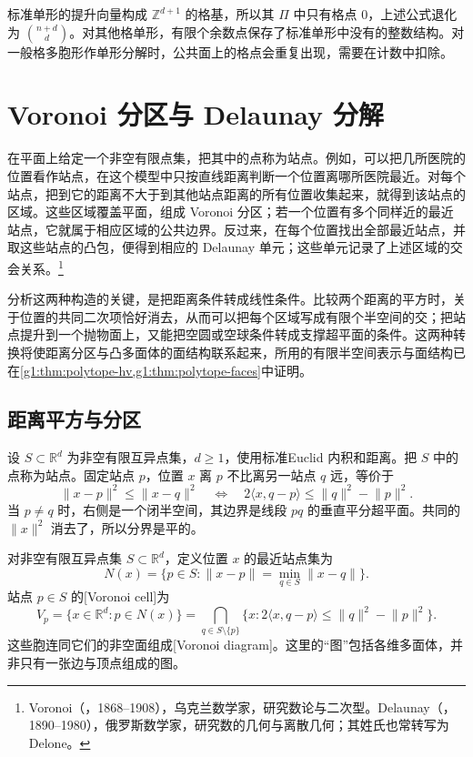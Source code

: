 标准单形的提升向量构成 \(\mathbb Z^{d+1}\) 的格基，所以其 \(\Pi\) 中只有格点 \(0\)，上述公式退化为 \(\binom{n+d}{d}\)。对其他格单形，有限个余数点保存了标准单形中没有的整数结构。对一般格多胞形作单形分解时，公共面上的格点会重复出现，需要在计数中扣除。

\section{Voronoi 分区与 Delaunay 分解}
\label{g1:sec:B02}

在平面上给定一个非空有限点集，把其中的点称为站点。例如，可以把几所医院的位置看作站点，在这个模型中只按直线距离判断一个位置离哪所医院最近。对每个站点，把到它的距离不大于到其他站点距离的所有位置收集起来，就得到该站点的区域。这些区域覆盖平面，组成 Voronoi 分区；若一个位置有多个同样近的最近站点，它就属于相应区域的公共边界。反过来，在每个位置找出全部最近站点，并取这些站点的凸包，便得到相应的 Delaunay 单元；这些单元记录了上述区域的交会关系。\footnote{Voronoi（，1868--1908），乌克兰数学家，研究数论与二次型。Delaunay（，1890--1980），俄罗斯数学家，研究数的几何与离散几何；其姓氏也常转写为 Delone。}

\ProseParagraphBreak

分析这两种构造的关键，是把距离条件转成线性条件。比较两个距离的平方时，关于位置的共同二次项恰好消去，从而可以把每个区域写成有限个半空间的交；把站点提升到一个抛物面上，又能把空圆或空球条件转成支撑超平面的条件。这两种转换将使距离分区与凸多面体的面结构联系起来，所用的有限半空间表示与面结构已在\cref{g1:thm:polytope-hv,g1:thm:polytope-faces}中证明。

\subsection{距离平方与分区}
\label{g1:subsec:B02:01}

设 \(S\subset\mathbb R^d\) 为非空有限互异点集，\(d\ge1\)，使用标准Euclid 内积和距离。把 \(S\) 中的点称为站点。固定站点 \(p\)，位置 \(x\) 离 \(p\) 不比离另一站点 \(q\) 远，等价于
\begin{equation}\label{g1:eq:voronoi-halfspace}
	\lVert x-p\rVert^2\le\lVert x-q\rVert^2
	\quad\Longleftrightarrow\quad
	2\langle x,q-p\rangle\le\lVert q\rVert^2-\lVert p\rVert^2.
\end{equation}
当 \(p\ne q\) 时，右侧是一个闭半空间，其边界是线段 \(pq\) 的垂直平分超平面。共同的 \(\lVert x\rVert^2\) 消去了，所以分界是平的。

\begin{definition}\label{g1:def:voronoi-cell}
	对非空有限互异点集 \(S\subset\mathbb R^d\)，定义位置 \(x\) 的最近站点集为
	\[
		N(x)=\{p\in S:\lVert x-p\rVert=\min_{q\in S}\lVert x-q\rVert\}.
	\]
	站点 \(p\in S\) 的[Voronoi cell]为
	\[
		V_p=\{x\in\mathbb R^d:p\in N(x)\}
		=\bigcap_{q\in S\setminus\{p\}}
		\{x:2\langle x,q-p\rangle\le\lVert q\rVert^2-\lVert p\rVert^2\}.
	\]
	这些胞连同它们的非空面组成[Voronoi diagram]。这里的“图”包括各维多面体，并非只有一张边与顶点组成的图。
\end{definition}

